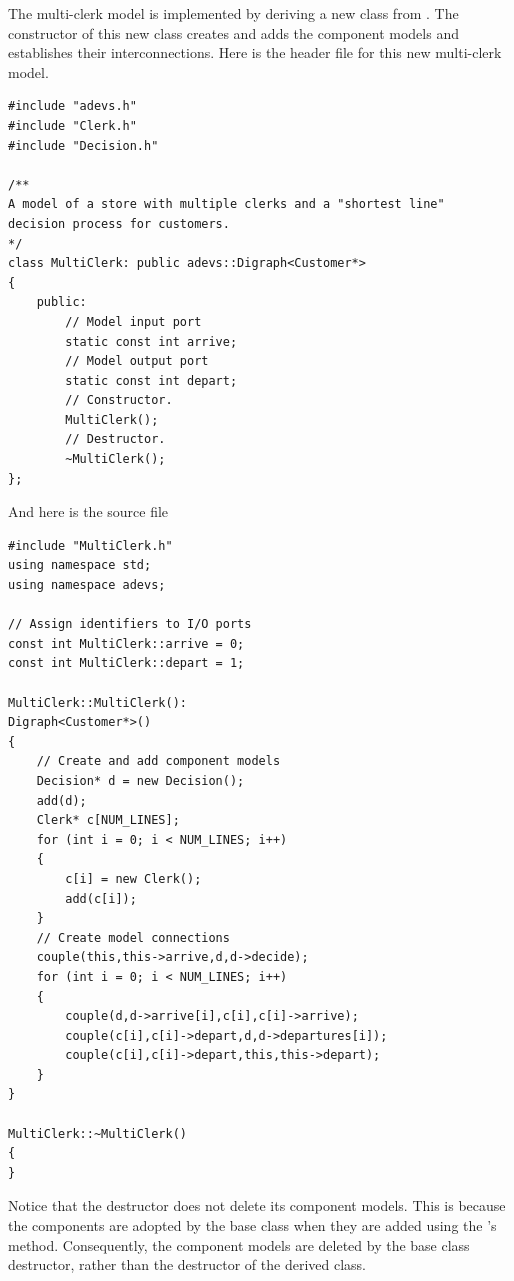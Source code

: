 The multi-clerk model is implemented by deriving a new class from . The constructor of this new class creates and adds the component models and establishes their interconnections. Here is the header file for this new multi-clerk model.
\begin{verbatim}
#include "adevs.h"
#include "Clerk.h"
#include "Decision.h"

/**
A model of a store with multiple clerks and a "shortest line"
decision process for customers.
*/
class MultiClerk: public adevs::Digraph<Customer*>
{
    public:
        // Model input port
        static const int arrive;
        // Model output port
        static const int depart;
        // Constructor.
        MultiClerk();
        // Destructor.
        ~MultiClerk();
};
\end{verbatim}
And here is the source file
\begin{verbatim}
#include "MultiClerk.h"
using namespace std;
using namespace adevs;

// Assign identifiers to I/O ports
const int MultiClerk::arrive = 0;
const int MultiClerk::depart = 1;

MultiClerk::MultiClerk():
Digraph<Customer*>()
{
    // Create and add component models
    Decision* d = new Decision();
    add(d);
    Clerk* c[NUM_LINES];
    for (int i = 0; i < NUM_LINES; i++)
    {
        c[i] = new Clerk();
        add(c[i]);
    }
    // Create model connections
    couple(this,this->arrive,d,d->decide);
    for (int i = 0; i < NUM_LINES; i++)
    {
        couple(d,d->arrive[i],c[i],c[i]->arrive);
        couple(c[i],c[i]->depart,d,d->departures[i]);
        couple(c[i],c[i]->depart,this,this->depart);
    }
}

MultiClerk::~MultiClerk()
{
}
\end{verbatim}
Notice that the  destructor does not delete its component models. This is because the components are adopted by the base class when they are added using the 's  method. Consequently, the component models are deleted by the base class destructor, rather than the destructor of the derived class.

